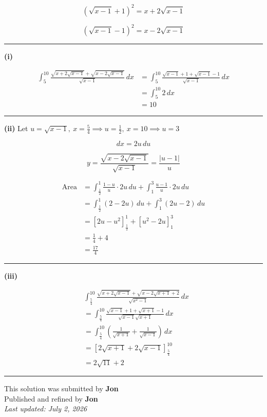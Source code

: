 \documentclass[12pt]{article}
\begin{document}
\newcommand{\ds}{\displaystyle}

$$(\sqrt{x-1}+1)^2=x+2\sqrt{x-1}$$

$$(\sqrt{x-1}-1)^2=x-2\sqrt{x-1}$$

\bigskip\hrule\bigskip

\textbf{(i)}

\begin{align*}
\int_5^{10}\frac{\sqrt{x+2\sqrt{x-1}}+\sqrt{x-2\sqrt{x-1}}}{\sqrt{x-1}}\,dx
&=\int_5^{10}\frac{\sqrt{x-1}+1+\sqrt{x-1}-1}{\sqrt{x-1}}\,dx\\
&=\int_5^{10}2\,dx\\
&=10
\end{align*}

\bigskip\hrule\bigskip

\textbf{(ii)} Let $\ds u=\sqrt{x-1},\ x=\frac54\implies u=\frac12,\  x=10\implies u=3$

$$dx=2u\,du$$

$$y=\frac{\sqrt{x-2\sqrt{x-1}}}{\sqrt{x-1}}=\frac{|u-1|}{u}$$

\begin{align*}
\text{Area}
&=\int_{\frac12}^{1}\frac{1-u}{u}\cdot 2u\,du
+\int_1^3\frac{u-1}{u}\cdot 2u\,du\\
&=\int_{\frac12}^{1}(2-2u)\,du+\int_1^3(2u-2)\,du\\
&=\left[2u-u^2\right]_{\frac12}^{1}+\left[u^2-2u\right]_1^3\\
&=\frac14+4\\
&=\frac{17}{4}
\end{align*}

\bigskip\hrule\bigskip

\textbf{(iii)}

\begin{align*}
&\int_{\frac54}^{10}\frac{\sqrt{x+2\sqrt{x-1}}+\sqrt{x-2\sqrt{x+1}+2}}{\sqrt{x^2-1}}\,dx\\
&=\int_{\frac54}^{10}\frac{\sqrt{x-1}+1+\sqrt{x+1}-1}{\sqrt{x-1}\sqrt{x+1}}\,dx\\
&=\int_{\frac54}^{10}\left(\frac1{\sqrt{x+1}}+\frac1{\sqrt{x-1}}\right)\,dx\\
&=\left[2\sqrt{x+1}+2\sqrt{x-1}\right]_{\frac54}^{10}\\
&=2\sqrt{11}+2
\end{align*}

\bigskip
\hrule
\begin{center}
    This solution was submitted by \textbf{Jon}\\[4pt]
    Published and refined by \textbf{Jon}\\[8pt]
    \textit{Last updated: July 2, 2026}
\end{center}
\end{document}
